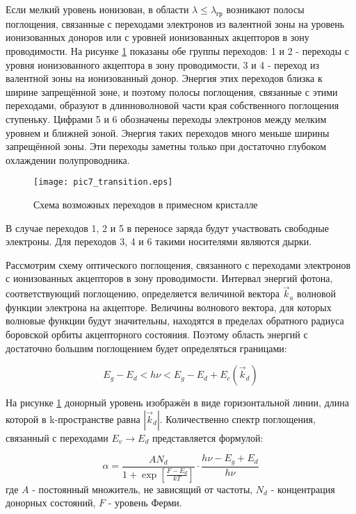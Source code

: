 Если мелкий уровень ионизован, в области $\lambda \le \lambda_{\text{гр}}$ возникают полосы поглощения, связанные с переходами электронов из валентной зоны на уровень ионизованных доноров или с уровней ионизованных акцепторов в зону проводимости. На рисунке \ref{pic7_transition} показаны обе группы переходов: 1 и 2 - переходы с уровня ионизованного акцептора в зону проводимости, 3 и 4 - переход из валентной зоны на ионизованный донор. Энергия этих переходов близка к ширине запрещённой зоне, и поэтому полосы поглощения, связанные с этими переходами, образуют в длинноволновой части края собственного поглощения ступеньку. Цифрами 5 и 6 обозначены переходы электронов между мелким уровнем и ближней зоной. Энергия таких переходов много меньше ширины запрещённой зоны. Эти переходы заметны только при достаточно глубоком охлаждении полупроводника.

\begin{figure}[h!]\centering
\texttt{[image: pic7\_transition.eps]}
\caption{Схема возможных переходов в примесном кристалле}
\label{pic7_transition}
\end{figure}

В случае переходов 1, 2 и 5 в переносе заряда будут участвовать свободные электроны. Для переходов 3, 4 и 6 такими носителями являются дырки.

Рассмотрим схему оптического поглощения, связанного с переходами электронов с ионизованных акцепторов в зону проводимости. Интервал энергий фотона, соответствующий поглощению, определяется величиной вектора $\overrightarrow{k}_{a}$ волновой функции электрона на акцепторе. Величины волнового вектора, для которых волновые функции будут значительны, находятся в пределах обратного радиуса боровской орбиты акцепторного состояния. Поэтому область энергий с достаточно большим поглощением будет определяться границами:

\begin{equation}
E_{g} - E_{d} < h \nu < E_{g} - E_{d} + E_{c}(\overrightarrow{k}_{d})
\end{equation}

На рисунке \ref{pic7_transition} донорный уровень изображён в виде горизонтальной линии, длина которой в k-пространстве равна $|\overrightarrow{k}_{d}|$. Количественно спектр поглощения, связанный с переходами $E_{v} \rightarrow E_{d}$ представляется формулой:

\begin{equation}
\alpha = \frac{A N_{d}}{1+\exp \left[ \frac{F - E_{d}}{k T} \right]} \cdot \frac{h \nu - E_{g} + E_{d}}{h \nu}
\end{equation}
где $A$ - постоянный множитель, не зависящий от частоты, $N_{d}$ - концентрация донорных состояний, $F$ - уровень Ферми.

